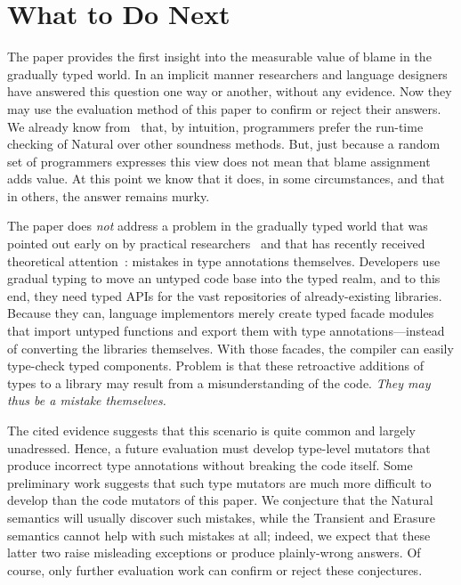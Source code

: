 \section{What to Do Next} 
\label{sec:conclusion}

The paper provides the first insight into the measurable value of blame
 in the gradually typed world. In an implicit manner researchers and
language designers have answered this question one way or another, without any
evidence. Now they may use the evaluation method of this paper to
confirm or reject their answers. We already know from~\citet{tgpk-dls-2018}
that, by intuition, programmers prefer the run-time checking of Natural over
other soundness methods. But, just because a random set of programmers expresses
this view does not mean that blame assignment adds value. At this point we know
that it does, in some circumstances, and that in others, the answer remains
murky.

The paper does {\em not\/} address a problem in the gradually typed world that
was pointed out early on by practical researchers~\cite{incorrect-ts,
sta-nt-base-types, wmwz-ecoop-2017} and that has recently received theoretical
attention~\cite{gfd-oopsla-2019, cc-oopsla-20}: mistakes in type annotations themselves.
Developers use gradual typing to move an untyped code base into the typed realm,
and to this end, they need typed APIs for the vast repositories of
already-existing libraries. Because they can, language implementors merely
create typed facade modules that import untyped functions and export them with
type annotations---instead of converting the libraries themselves. With those
facades, the compiler can easily type-check typed components. Problem is
that these retroactive additions of types to a library may result from a misunderstanding of the
code. \emph{They may thus be a mistake themselves.}

The cited evidence suggests that this scenario is quite common and largely unadressed.
Hence, a future evaluation must develop type-level mutators that produce incorrect type
annotations without breaking the code itself. Some preliminary work suggests
that such type mutators are much more difficult to develop than the code
mutators of this paper. We conjecture that the Natural semantics will
usually discover such mistakes, while the Transient and Erasure semantics cannot
help with such mistakes at all; indeed, we expect that these latter two raise
misleading exceptions or produce plainly-wrong answers.  Of course, only further
evaluation work can confirm or reject these conjectures.



